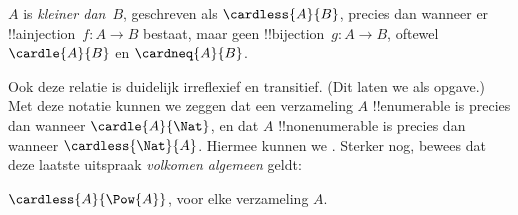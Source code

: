 \documentclass[openany]{memoir}
\begin{document}
\begin{defn}
$A$ is \emph{kleiner dan}~$B$, geschreven als $\cardless{A}{B}$, precies dan
wanneer er !!a{injection}~$f\colon A \to B$ bestaat, maar geen
!!{bijection}~$g\colon A \to B$, oftewel $\cardle{A}{B}$ en
$\cardneq{A}{B}$.
\end{defn}

Ook deze relatie is duidelijk irreflexief en transitief. (Dit laten we als
opgave.) Met deze notatie kunnen we zeggen dat een verzameling $A$
!!{enumerable} is precies dan wanneer $\cardle{A}{\Nat}$, en dat $A$
!!{nonenumerable} is precies dan wanneer $\cardless{\Nat}{A}$. Hiermee
kunnen we
. Sterker nog, \citet{Cantor1892}
bewees dat deze laatste uitspraak \emph{volkomen algemeen} geldt:

\begin{thm}[Cantor]
$\cardless{A}{\Pow{A}}$, voor elke verzameling $A$.
\end{thm}
\end{document}
